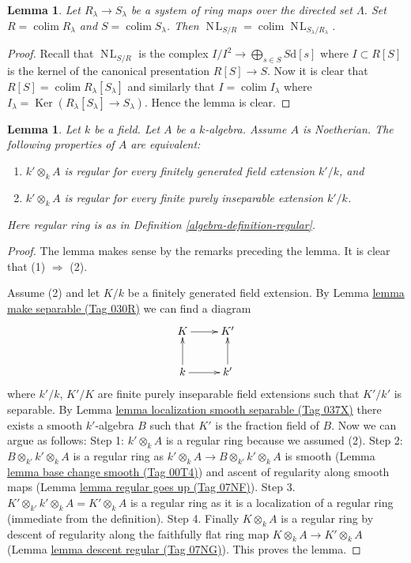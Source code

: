 \documentclass{amsart}
\theoremstyle{plain}
\newtheorem{lemma}[subsection]{Lemma}
\theoremstyle{definition}
\theoremstyle{remark}
\numberwithin{equation}{subsection}
\def\colim{\mathop{\mathrm{colim}}\nolimits}
\def\NL{\mathop{N\!L}\nolimits}
\def\Ker{\mathop{\mathrm{Ker}}}
\begin{document}
\begin{lemma}
\label{algebra-lemma-colimits-NL}
Let $R_\lambda \to S_\lambda$ be a system of ring maps over
the directed set $\Lambda$.
Set $R = \colim R_\lambda$ and $S = \colim S_\lambda$.
Then $\NL_{S/R} = \colim \NL_{S_\lambda/R_\lambda}$.
\end{lemma}

\begin{proof}
Recall that $\NL_{S/R}$ is the complex
$I/I^2 \to \bigoplus_{s \in S} S\text{d}[s]$ where $I \subset R[S]$
is the kernel of the canonical presentation $R[S] \to S$.
Now it is clear that $R[S] = \colim R_\lambda[S_\lambda]$ and similarly
that $I = \colim I_\lambda$ where
$I_\lambda = \Ker(R_\lambda[S_\lambda] \to S_\lambda)$.
Hence the lemma is clear.
\end{proof}


\begin{lemma}
\label{algebra-lemma-geometrically-regular}
Let $k$ be a field. Let $A$ be a $k$-algebra.
Assume $A$ is Noetherian.
The following properties of $A$ are equivalent:
\begin{enumerate}
\item $k' \otimes_k A$ is regular for every finitely generated field
extension $k'/k$, and
\item $k' \otimes_k A$ is regular for every finite purely inseparable
extension $k'/k$.
\end{enumerate}
Here regular ring is as in Definition \ref{algebra-definition-regular}.
\end{lemma}

\begin{proof}
The lemma makes sense by the remarks preceding the lemma.
It is clear that (1) $\Rightarrow$ (2).

\medskip\noindent
Assume (2) and let $K/k$ be a finitely generated field extension.
By Lemma \href{https://stacks.math.columbia.edu/tag/030R}{lemma make separable (Tag 030R)} we can find a diagram
$$
\xymatrix{
K \ar[r] & K' \\
k \ar[u] \ar[r] & k' \ar[u]
}
$$
where $k'/k$, $K'/K$ are finite purely inseparable field
extensions such that $K'/k'$ is separable. By
Lemma \href{https://stacks.math.columbia.edu/tag/037X}{lemma localization smooth separable (Tag 037X)}
there exists a smooth $k'$-algebra $B$ such that $K'$ is the
fraction field of $B$. Now we can argue as follows:
Step 1: $k' \otimes_k A$ is a regular ring because we assumed (2).
Step 2: $B \otimes_{k'} k' \otimes_k A$ is a regular ring as
$k' \otimes_k A \to B \otimes_{k'} k' \otimes_k A$ is smooth
(Lemma \href{https://stacks.math.columbia.edu/tag/00T4}{lemma base change smooth (Tag 00T4)})
and ascent of regularity along smooth maps
(Lemma \href{https://stacks.math.columbia.edu/tag/07NF}{lemma regular goes up (Tag 07NF)}).
Step 3. $K' \otimes_{k'} k' \otimes_k A = K' \otimes_k A$ is
a regular ring as it is a localization of a regular ring
(immediate from the definition).
Step 4. Finally $K \otimes_k A$ is a regular ring by descent of
regularity along the faithfully flat ring map
$K \otimes_k A \to K' \otimes_k A$ (Lemma \href{https://stacks.math.columbia.edu/tag/07NG}{lemma descent regular (Tag 07NG)}).
This proves the lemma.
\end{proof}
\end{document}
